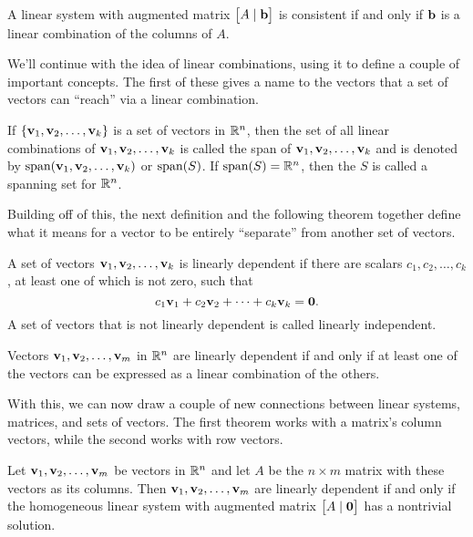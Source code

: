 \documentclass[../m073main.tex]{subfiles}
\begin{document}
\begin{theorem}
	A linear system with augmented matrix $\begin{bmatrix} A \;|\; \mathbf{b} \end{bmatrix}$ is consistent if and only if $\mathbf{b}$ is a linear combination of the columns of $A$.
\end{theorem}

We'll continue with the idea of linear combinations, using it to define a couple of important concepts.
The first of these gives a name to the vectors that a set of vectors can ``reach'' via a linear combination.

\begin{definition}[Span]
	If $\{\mathbf{v}_1, \mathbf{v}_2, \ldots, \mathbf{v}_k\}$ is a set of vectors in $\mathbb{R}^n$, then the set of all linear combinations of $\mathbf{v}_1, \mathbf{v}_2, \ldots, \mathbf{v}_k$ is called the span of $\mathbf{v}_1, \mathbf{v}_2, \ldots, \mathbf{v}_k$ and is denoted by $\textrm{span}(\mathbf{v}_1, \mathbf{v}_2, \ldots, \mathbf{v}_k)$ or $\textrm{span}(S)$.
	If $\textrm{span}(S) = \mathbb{R}^n$, then the $S$ is called a spanning set for $\mathbb{R}^n$.
\end{definition}

Building off of this, the next definition and the following theorem together define what it means for a vector to be entirely ``separate'' from another set of vectors.

\begin{definition}
	A set of vectors $\mathbf{v}_1, \mathbf{v}_2, \ldots, \mathbf{v}_k$ is linearly dependent if there are scalars $c_1, c_2, \ldots, c_k$, at least one of which is not zero, such that
	\[ c_1 \mathbf{v}_1 + c_2 \mathbf{v}_2 + \cdots + c_k \mathbf{v}_k = \mathbf{0}. \]
	A set of vectors that is not linearly dependent is called linearly independent.
\end{definition}

\begin{theorem}
	Vectors $\mathbf{v}_1, \mathbf{v}_2, \ldots, \mathbf{v}_m$ in $\mathbb{R}^n$ are linearly dependent if and only if at least one of the vectors can be expressed as a linear combination of the others.
\end{theorem}

With this, we can now draw a couple of new connections between linear systems, matrices, and sets of vectors.
The first theorem works with a matrix's column vectors, while the second works with row vectors.

\begin{theorem}
	Let $\mathbf{v}_1, \mathbf{v}_2, \ldots, \mathbf{v}_m$ be vectors in $\mathbb{R}^n$ and let $A$ be the $n \times m$ matrix with these vectors as its columns.
	Then $\mathbf{v}_1, \mathbf{v}_2, \ldots, \mathbf{v}_m$ are linearly dependent if and only if the homogeneous linear system with augmented matrix $\begin{bmatrix} A \;|\; \mathbf{0} \end{bmatrix}$ has a nontrivial solution.
\end{theorem}
\end{document}
